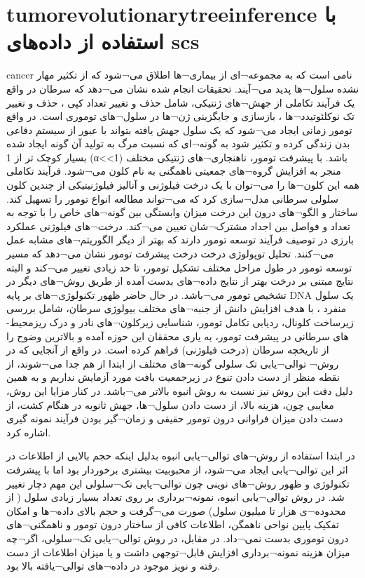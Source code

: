\section{\gls{tumorevolutionarytreeinference} با استفاده از داده‌های \gls{scs}}
\gls{cancer} نامی است که به مجموعه¬ای از بیماری¬ها اطلاق می¬شود که از تکثیر مهار نشده سلول¬ها پدید می¬آیند. تحقیقات انجام شده نشان می¬دهد که سرطان در واقع یک فرآیند تکاملی از جهش¬های  ژنتیکی، شامل حذف و تغییر تعداد کپی ، حذف و تغییر تک نوکلئوتیدد¬ها  ، بازسازی و جایگزینی ژن¬ها در سلول¬های توموری است. در واقع تومور زمانی ایجاد می¬شود که یک سلول جهش یافته بتواند با عبور از سیستم دفاعی بدن زندگی کرده و تکثیر شود به گونه¬ای که نسبت مرگ به تولید آن گونه ایجاد شده بسیار کوچک تر از 1   (α<<1) باشد. با پیشرفت تومور، ناهنجاری¬های ژنتیکی  مختلف منجر به افزایش گروه¬های جمعیتی ناهمگنی به نام کلون  می¬شود. فرآیند تکاملی همه این کلون¬ها را می¬توان با یک درخت فیلوژنی   و آنالیز فیلوژنیتیکی از چندین کلون سلولی سرطانی مدل¬سازی کرد که می¬تواند مطالعه انواع تومور را تسهیل کند. ساختار و الگو¬های درون این درخت میزان وابستگی بین گونه¬های خاص را با توجه به تعداد و فواصل بین اجداد مشترک¬شان تعیین می¬کند. درخت¬های فیلوژنی عملکرد بارزی در توصیف فرآیند توسعه تومور دارند که بهتر از دیگر الگوریتم¬های مشابه عمل می¬کنند. تحلیل توپولوژی درخت درخت پیشرفت تومور نشان می¬دهد که مسیر توسعه تومور در طول مراحل مختلف تشکیل تومور، تا حد زیادی تغییر می¬کند و البته نتایج مبتنی بر درخت بهتر از نتایج داده¬های بدست آمده از طریق روش¬های دیگر در تشخیص تومور می¬باشد.
در حال حاضر ظهور تکنولوژی¬های بر پایه DNA یک سلول منفرد ، با هدف افزایش دانش از جنبه¬های مختلف بیولوژی سرطان، شامل بررسی زیرساخت کلونال، ردیابی تکامل تومور، شناسایی زیرکلون¬های نادر و درک ریزمحیط-های سرطانی در پیشرفت تومور، به یاری محققان این حوزه آمده و بالاترین وضوح را از تاریخچه سرطان (درخت فیلوژنی) فراهم کرده است. در واقع از آنجایی که در روش¬ توالی¬یابی تک سلولی  گونه¬های مختلف از ابتدا از هم جدا  می¬شوند، از نقطه منظر از دست دادن تنوع در زیرجمعیت بافت مورد آزمایش نداریم و به همین دلیل دقت این روش نیز نسبت به روش انبوه بالاتر می¬باشد. در کنار مزایا این روش، معایبی چون، هزینه بالا، از دست دادن سلول¬ها، جهش ثانویه در هنگام کشت، از دست دادن میزان فراوانی درون تومور حقیقی و زمان¬گیر بودن فرآیند نمونه گیری اشاره کرد.

در ابتدا استفاده از روش¬های توالی¬یابی انبوه  بدلیل اینکه حجم بالایی از اطلاعات در اثر این توالی¬یابی ایجاد می¬شود، از محبوبیت بیشتری برخوردار بود  اما با پیشرفت تکنولوژی و ظهور روش¬های نوینی چون توالی¬یابی تک¬سلولی این مهم دچار تغییر شد. در روش توالی¬یابی انبوه، نمونه¬برداری بر روی تعداد بسیار زیادی سلول ( از محدوده¬ی هزار تا میلیون سلول) صورت می¬گرفت و حجم بالای داده¬ها و امکان تفکیک پایین نواحی ناهمگن، اطلاعات کافی از ساختار درون تومور و ناهمگنی¬های درون توموری بدست نمی¬داد. در مقابل، در روش توالی¬یابی تک¬سلولی، اگر¬چه میزان هزینه نمونه¬برداری افزایش قابل¬توجهی داشت و یا میزان اطلاعات از دست رفته  و نویز موجود در داده¬های توالی¬یافته بالا بود.
